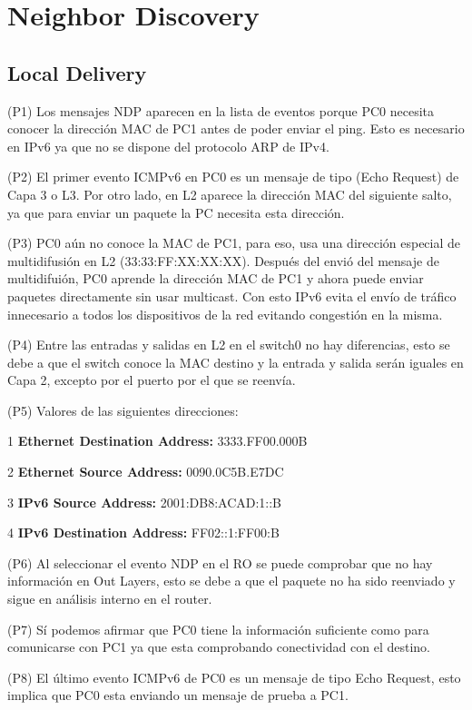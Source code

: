\documentclass[12pt]{article}
\begin{document}
\section{Neighbor Discovery}
\subsection{Local Delivery}
(P1) Los mensajes NDP aparecen en la lista de eventos porque PC0 necesita conocer la dirección MAC de PC1 antes de poder enviar el ping. Esto es necesario en IPv6 ya que no se dispone del protocolo ARP de IPv4.

(P2) El primer evento ICMPv6 en PC0 es un mensaje de tipo (Echo Request) de Capa 3 o L3. Por otro lado, en L2 aparece la dirección MAC del siguiente salto, ya que para enviar un paquete la PC necesita esta dirección.

(P3) PC0 aún no conoce la MAC de PC1, para eso, usa una dirección especial de multidifusión en L2 (33:33:FF:XX:XX:XX). Después del envió del mensaje de multidifuión, PC0 aprende la dirección MAC de PC1 y ahora puede enviar paquetes directamente sin usar multicast. Con esto IPv6 evita el envío de tráfico innecesario a todos los dispositivos de la red evitando congestión en la misma.

(P4) Entre las entradas y salidas en L2 en el switch0 no hay diferencias, esto se debe a que el switch conoce la MAC destino y la entrada y salida serán iguales en Capa 2, excepto por el puerto por el que se reenvía.

(P5) Valores de las siguientes direcciones:

1 \textbf{Ethernet Destination Address:} 3333.FF00.000B

2 \textbf{Ethernet Source Address:} 0090.0C5B.E7DC

3 \textbf{IPv6 Source Address:} 2001:DB8:ACAD:1::B

4 \textbf{IPv6 Destination Address:} FF02::1:FF00:B

(P6) Al seleccionar el  evento NDP en el RO se puede comprobar que no hay información en Out Layers, esto se debe a que el paquete no ha sido reenviado y sigue en análisis interno en el router.

(P7) Sí podemos afirmar que PC0 tiene la información suficiente como para comunicarse con PC1 ya que esta comprobando conectividad con el destino.

(P8) El último evento ICMPv6 de PC0 es un mensaje de tipo Echo Request, esto implica que PC0 esta enviando un mensaje de prueba a PC1.
\end{document}
